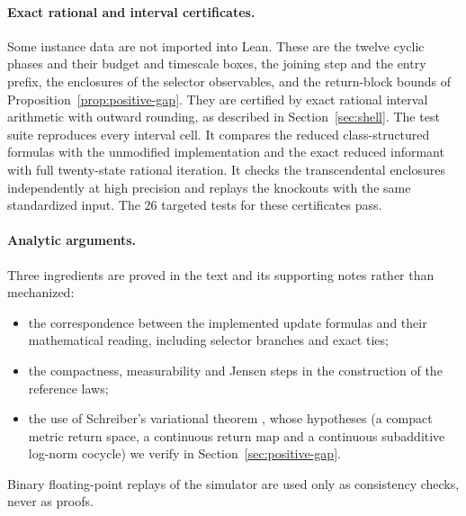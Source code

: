 \paragraph{Exact rational and interval certificates.}
Some instance data are not imported into Lean. These are the twelve cyclic phases and their budget and timescale boxes, the joining step and the entry prefix, the enclosures of the selector observables, and the return-block bounds of Proposition~\ref{prop:positive-gap}. They are certified by exact rational interval arithmetic with outward rounding, as described in Section~\ref{sec:shell}. The test suite reproduces every interval cell. It compares the reduced class-structured formulas with the unmodified implementation and the exact reduced informant with full twenty-state rational iteration. It checks the transcendental enclosures independently at high precision and replays the knockouts with the same standardized input. The $26$ targeted tests for these certificates pass.

\paragraph{Analytic arguments.}
Three ingredients are proved in the text and its supporting notes rather than mechanized:
\begin{itemize}
  \item the correspondence between the implemented update formulas and their mathematical reading, including selector branches and exact ties;
  \item the compactness, measurability and Jensen steps in the construction of the reference laws;
  \item the use of Schreiber's variational theorem \cite{Schreiber1998Subadditive}, whose hypotheses (a compact metric return space, a continuous return map and a continuous subadditive log-norm cocycle) we verify in Section~\ref{sec:positive-gap}.
\end{itemize}
Binary floating-point replays of the simulator are used only as consistency checks, never as proofs.



